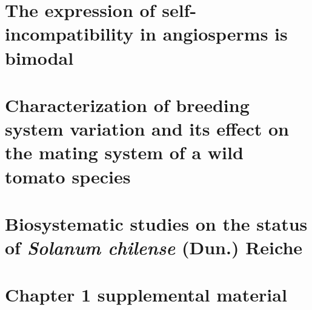 \documentclass{uicthesi}
\begin{document}
\abstract


\summary


%
\chapter{The expression of self-incompatibility in angiosperms is bimodal}

\clearpage

%

\chapter{Characterization of breeding system variation and its effect on the mating system of a wild tomato species}



\chapter{Biosystematic studies on the status of \textit{Solanum chilense} (Dun.) Reiche}



\appendices
\newpage
\appendix
\chapter{Chapter 1 supplemental material}




\bibforma

\newpage
\vita

\end{document}
